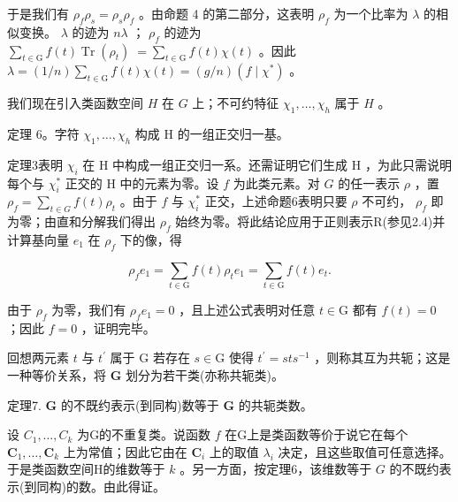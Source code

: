 \documentclass[10pt]{article}
\begin{document}
于是我们有 \({\rho }_{f}{\rho }_{s} = {\rho }_{s}{\rho }_{f}\) 。由命题 4 的第二部分，这表明 \({\rho }_{f}\) 为一个比率为 \(\lambda\) 的相似变换。 \(\lambda\) 的迹为 \({n\lambda }\) ； \({\rho }_{f}\) 的迹为 \(\mathop{\sum }\limits_{{t \in  \mathrm{G}}}f\left( t\right) \operatorname{Tr}\left( {\rho }_{t}\right) \; = \mathop{\sum }\limits_{{t \in  \mathrm{G}}}f\left( t\right) \chi \left( t\right)\) 。因此 \(\lambda  = \left( {1/n}\right) \mathop{\sum }\limits_{{t \in  \mathrm{G}}}f\left( t\right) \chi \left( t\right)  = \left( {g/n}\right) \left( {f \mid  {\chi }^{ * }}\right)\) 。

我们现在引入类函数空间 \(H\) 在 \(G\) 上；不可约特征 \({\chi }_{1},\ldots ,{\chi }_{h}\) 属于 \(H\) 。

定理 6。字符 \({\chi }_{1},\ldots ,{\chi }_{h}\) 构成 \(\mathrm{H}\) 的一组正交归一基。

定理3表明 \({\chi }_{i}\) 在 \(\mathrm{H}\) 中构成一组正交归一系。还需证明它们生成 \(\mathrm{H}\) ，为此只需说明每个与 \({\chi }_{i}^{ * }\) 正交的 \(\mathrm{H}\) 中的元素为零。设 \(f\) 为此类元素。对 \(G\) 的任一表示 \(\rho\) ，置 \({\rho }_{f} = \mathop{\sum }\limits_{{t \in  G}}f\left( t\right) {\rho }_{t}\) 。由于 \(f\) 与 \({\chi }_{i}^{ * }\) 正交，上述命题6表明只要 \(\rho\) 不可约， \({\rho }_{f}\) 即为零；由直和分解我们得出 \({\rho }_{f}\) 始终为零。将此结论应用于正则表示R(参见2.4)并计算基向量 \({e}_{1}\) 在 \({\rho }_{f}\) 下的像，得

\[
{\rho }_{f}{e}_{1} = \mathop{\sum }\limits_{{t \in  \mathrm{G}}}f\left( t\right) {\rho }_{t}{e}_{1} = \mathop{\sum }\limits_{{t \in  \mathrm{G}}}f\left( t\right) {e}_{t}.
\]

由于 \({\rho }_{f}\) 为零，我们有 \({\rho }_{f}{e}_{1} = 0\) ，且上述公式表明对任意 \(t \in  \mathrm{G}\) 都有 \(f\left( t\right)  = 0\) ；因此 \(f = 0\) ，证明完毕。

回想两元素 \(t\) 与 \({t}^{\prime }\) 属于 \(\mathrm{G}\) 若存在 \(s \in  \mathrm{G}\) 使得 \({t}^{\prime } = {st}{s}^{-1}\) ，则称其互为共轭；这是一种等价关系，将 \(\mathbf{G}\) 划分为若干类(亦称共轭类)。

定理7. \(\mathbf{G}\) 的不既约表示(到同构)数等于 \(\mathbf{G}\) 的共轭类数。

设 \({C}_{1},\ldots ,{C}_{k}\) 为G的不重复类。说函数 \(f\) 在G上是类函数等价于说它在每个 \({\mathbf{C}}_{1},\ldots ,{\mathbf{C}}_{k}\) 上为常值；因此它由在 \({\mathbf{C}}_{i}\) 上的取值 \({\lambda }_{i}\) 决定，且这些取值可任意选择。于是类函数空间H的维数等于 \(k\) 。另一方面，按定理6，该维数等于 \(G\) 的不既约表示(到同构)的数。由此得证。
\end{document}
